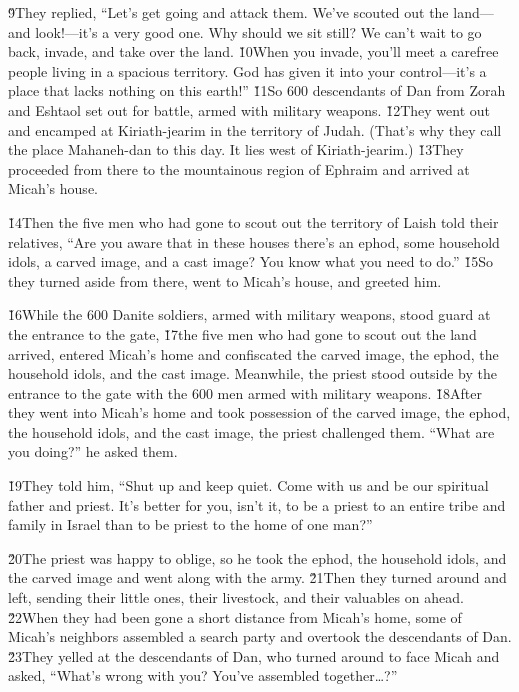 \v{9}They replied, ``Let's get going and attack them. We've scouted out the land---and look!---it's a very good one. Why should we sit still? We can't wait to go back, invade, and take over the land. \v{10}When you invade, you'll meet a carefree people living in a spacious territory. God has given it into your control---it's a place that lacks nothing on this earth!'' \v{11}So 600 descendants of Dan from Zorah and Eshtaol set out for battle, armed with military weapons. \v{12}They went out and encamped at Kiriath-jearim in the territory of Judah. (That's why they call the place Mahaneh-dan to this day. It lies west of Kiriath-jearim.) \v{13}They proceeded from there to the mountainous region of Ephraim and arrived at Micah's house.

\v{14}Then the five men who had gone to scout out the territory of Laish told their relatives, ``Are you aware that in these houses there's an ephod, some household idols, a carved image, and a cast image? You know what you need to do.'' \v{15}So they turned aside from there, went to Micah's house, and greeted him.

\v{16}While the 600 Danite soldiers, armed with military weapons, stood guard at the entrance to the gate, \v{17}the five men who had gone to scout out the land arrived, entered Micah's home and confiscated the carved image, the ephod, the household idols, and the cast image. Meanwhile, the priest stood outside by the entrance to the gate with the 600 men armed with military weapons. \v{18}After they went into Micah's home and took possession of the carved image, the ephod, the household idols, and the cast image, the priest challenged them. ``What are you doing?'' he asked them.

\v{19}They told him, ``Shut up and keep quiet. Come with us and be our spiritual father and priest. It's better for you, isn't it, to be a priest to an entire tribe and family in Israel than to be priest to the home of one man?''

\v{20}The priest was happy to oblige, so he took the ephod, the household idols, and the carved image and went along with the army. \v{21}Then they turned around and left, sending their little ones, their livestock, and their valuables on ahead. \v{22}When they had been gone a short distance from Micah's home, some of Micah's neighbors assembled a search party and overtook the descendants of Dan. \v{23}They yelled at the descendants of Dan, who turned around to face Micah and asked, ``What's wrong with you? You've assembled together{\ldots}?''

